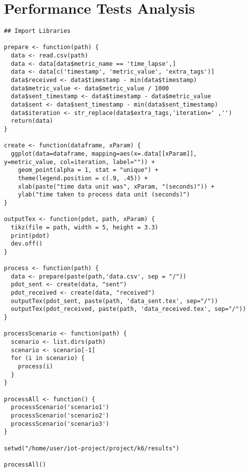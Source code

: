 \chapter{Performance Tests Analysis}
\label{AppendixG}

\begin{lstlisting}[style=Java, caption=Analysis Script, label={code:AppendixG:script}]
## Import Libraries

prepare <- function(path) {
  data <- read.csv(path)
  data <- data[data$metric_name == 'time_lapse',]
  data <- data[c('timestamp', 'metric_value', 'extra_tags')]
  data$received <- data$timestamp - min(data$timestamp)
  data$metric_value <- data$metric_value / 1000
  data$sent_timestamp <- data$timestamp - data$metric_value
  data$sent <- data$sent_timestamp - min(data$sent_timestamp)
  data$iteration <- str_replace(data$extra_tags,'iteration=' ,'')
  return(data)
}

create <- function(dataframe, xParam) {
  ggplot(data=dataframe, mapping=aes(x=.data[[xParam]], y=metric_value, col=iteration, label="")) + 
    geom_point(alpha = 1, stat = "unique") +
    theme(legend.position = c(.9, .45)) +
    xlab(paste("time data unit was", xParam, "(seconds)")) +
    ylab("time taken to process data unit (seconds)")
}

outputTex <- function(pdot, path, xParam) {
  tikz(file = path, width = 5, height = 3.3)
  print(pdot)
  dev.off()
}

process <- function(path) {
  data <- prepare(paste(path,'data.csv', sep = "/"))
  pdot_sent <- create(data, "sent")
  pdot_received <- create(data, "received")
  outputTex(pdot_sent, paste(path, 'data_sent.tex', sep="/"))
  outputTex(pdot_received, paste(path, 'data_received.tex', sep="/"))
}

processScenario <- function(path) {
  scenario <- list.dirs(path)
  scenario <- scenario[-1]
  for (i in scenario) {
    process(i)
  }
}

processAll <- function() {
  processScenario('scenario1')
  processScenario('scenario2')
  processScenario('scenario3')
}

setwd("/home/user/iot-project/project/k6/results")

processAll()
\end{lstlisting}
